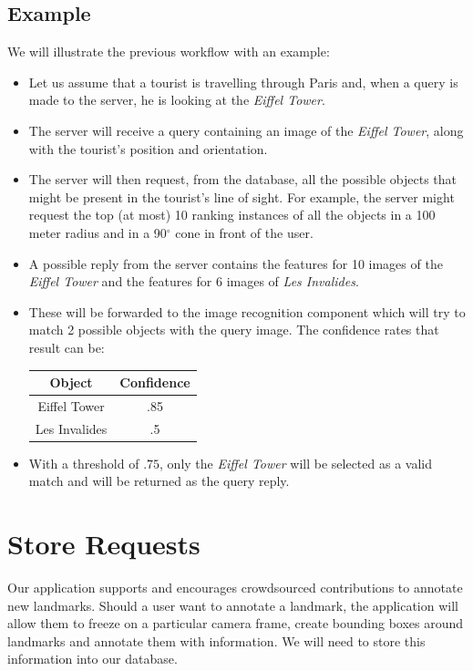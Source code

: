 \documentclass[a4paper,onecolumn,oneside,titlepage,11pt]{report}
\begin{document}
\subsection*{Example}
We will illustrate the previous workflow with an example:
\begin{itemize}
	\item Let us assume that a tourist is travelling through Paris and, when a query is made to the server, he is looking at the \emph{Eiffel Tower}.
	\item The server will receive a query containing an image of the \emph{Eiffel Tower}, along with the tourist's position and orientation. 
	\item The server will then request, from the database, all the possible objects that might be present in the tourist's line of sight. For example, the server might request the top (at most) 10 ranking instances of all the objects in a 100 meter radius and in a 90$^\circ$ cone in front of the user.
	\item A possible reply from the server contains the features for 10 images of the \emph{Eiffel Tower} and the features for 6 images of \emph{Les Invalides}.
	\item These will be forwarded to the image recognition component which will try to match 2 possible objects with the query image. The confidence rates that result can be:
		\begin{center}
			\begin{tabular}{|c|c|}
				\hline
				\textbf{Object} & \textbf{Confidence}\\
				\hline
				Eiffel Tower & .85\\
				Les Invalides & .5\\
				\hline
			\end{tabular}
		\end{center}
	\item With a threshold of $.75$, only the \emph{Eiffel Tower} will be selected as a valid match and will be returned as the query reply.
\end{itemize}

\section{Store Requests}
Our application supports and encourages crowdsourced contributions to annotate new landmarks. Should a user want to annotate a landmark, the application will allow them to freeze on a particular camera frame, create  bounding boxes around landmarks and annotate them with information. We will need to store this information into our database.
\end{document}
